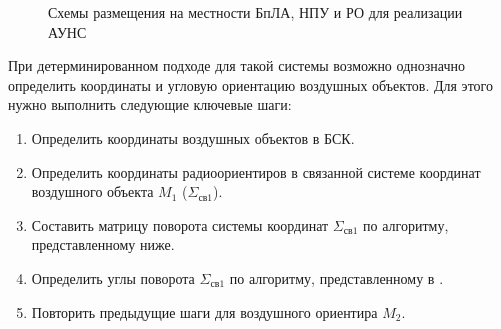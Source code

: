 \documentclass[a4paper,12pt]{article}
\begin{document}
\begin{figure}[htbp]
    \begin{center}


    \caption{Схемы размещения на местности БпЛА, НПУ и РО для реализации АУНС}
    \label{figure:pic3}
    \end{center}
\end{figure}

При детерминированном подходе для такой системы возможно однозначно определить координаты
и угловую ориентацию воздушных объектов. Для этого нужно выполнить следующие ключевые шаги:
\begin{enumerate}
    \item Определить координаты воздушных объектов в БСК.
    \item Определить координаты радиоориентиров в связанной системе координат воздушного объекта $M_1$ ($\Sigma_{\text{св}1}$).
    \item Составить матрицу поворота системы координат $\Sigma_{\text{св}1}$ по алгоритму, представленному ниже.
    \item Определить углы поворота $\Sigma_{\text{св}1}$ по алгоритму, представленному в \cite{antennas}.
    \item Повторить предыдущие шаги для воздушного ориентира $M_2$.
\end{enumerate}
\end{document}
